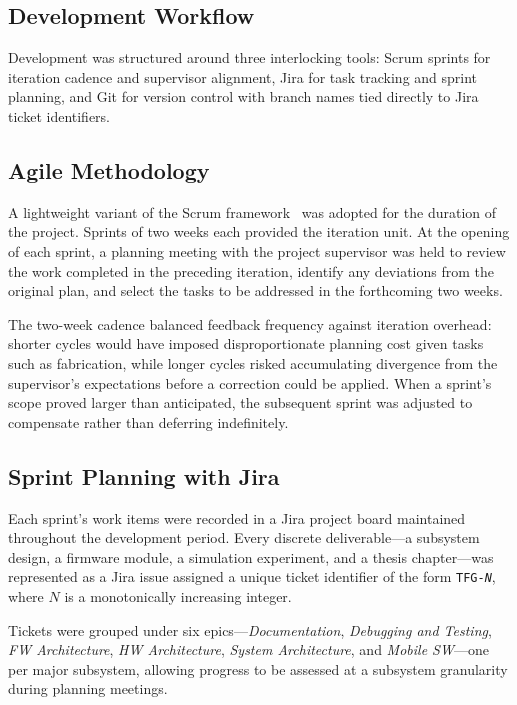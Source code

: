 \documentclass[english,bachelor]{tfgitic}[2026/01/22]
\begin{document}
\subsection{Development Workflow}

Development was structured around three interlocking tools: Scrum sprints for iteration cadence and supervisor alignment, Jira for task tracking and sprint planning, and Git for version control with branch names tied directly to Jira ticket identifiers.

\subsection{Agile Methodology}

A lightweight variant of the Scrum framework~\cite{schwaber2020scrum} was adopted for the duration of the project. Sprints of two weeks each provided the iteration unit. At the opening of each sprint, a planning meeting with the project supervisor was held to review the work completed in the preceding iteration, identify any deviations from the original plan, and select the tasks to be addressed in the forthcoming two weeks.

The two-week cadence balanced feedback frequency against iteration overhead: shorter cycles would have imposed disproportionate planning cost given tasks such as  fabrication, while longer cycles risked accumulating divergence from the supervisor's expectations before a correction could be applied. When a sprint's scope proved larger than anticipated, the subsequent sprint was adjusted to compensate rather than deferring indefinitely.

\subsection{Sprint Planning with Jira}

Each sprint's work items were recorded in a Jira project board maintained throughout the development period. Every discrete deliverable---a subsystem design, a firmware module, a simulation experiment, and a thesis chapter---was represented as a Jira issue assigned a unique ticket identifier of the form \texttt{TFG-\textit{N}}, where $N$ is a monotonically increasing integer.

Tickets were grouped under six epics---\emph{Documentation}, \emph{Debugging and Testing}, \emph{FW Architecture}, \emph{HW Architecture}, \emph{System Architecture}, and \emph{Mobile SW}---one per major subsystem, allowing progress to be assessed at a subsystem granularity during planning meetings.
\end{document}
